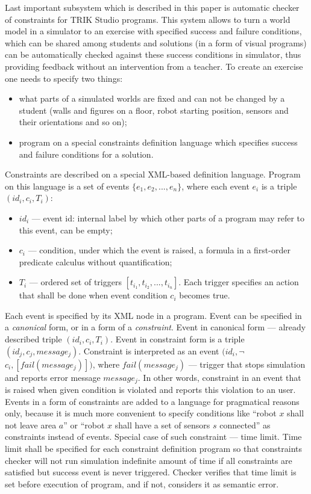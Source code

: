 \documentclass[conference]{IEEEtran}
\begin{document}
{Last important subsystem which is described in this paper is automatic checker of constraints for TRIK Studio programs. This system allows to turn a world model in a simulator to an exercise with specified success and failure conditions, which can be shared among students and solutions (in a form of visual programs) can be automatically checked against these success conditions in simulator, thus providing feedback without an intervention from a teacher. To create an exercise one needs to specify two things:

\begin{itemize}
    \item what parts of a simulated worlds are fixed and can not be changed by a student (walls and figures on a floor, robot starting position, sensors and their orientations and so on);
    \item program on a special constraints definition language which specifies success and failure conditions for a solution.
\end{itemize}

Constraints are described on a special XML-based definition language. Program on this language is a set of events $\{ e_1, e_2, ..., e_n \}$, where each event $e_i$ is a triple $(id_i, c_i, T_i)$:

\begin{itemize}
    \item $id_i$ --- event id: internal label by which other parts of a program may refer to this event, can be empty;
    \item $c_i$ --- condition, under which the event is raised, a formula in a first-order predicate calculus without quantification;
    \item $T_i$ --- ordered set of triggers $[ t_{i_1}, t_{i_2}, ..., t_{i_n} ]$. Each trigger specifies an action that shall be done when event condition $c_i$ becomes true.
\end{itemize}

Each event is specified by its XML node in a program. Event can be specified in a \textit{canonical} form, or in a form of a \textit{constraint}. Event in canonical form --- already described triple $(id_i, c_i, T_i)$. Event in constraint form is a triple $(id_j, c_j, message_j)$. Constraint is interpreted as an event $(id_i, $$\neg$$c_i, [ fail(message_j) ])$, where $fail(message_j)$ --- trigger that stops simulation and reports error message $message_j$. In other words, constraint in an event that is raised when given condition is violated and reports this violation to an user. Events in a form of constraints are added to a language for pragmatical reasons only, because it is much more convenient to specify conditions like "`robot $x$ shall not leave area $a$"' or "`robot $x$ shall have a set of sensors $s$ connected"' as constraints instead of events. Special case of such constraint --- time limit. Time limit shall be specified for each constraint definition program so that constraints checker will not run simulation indefinite amount of time if all constraints are satisfied but success event is never triggered. Checker verifies that time limit is set before execution of program, and if not, considers it as semantic error.

}
\end{document}
